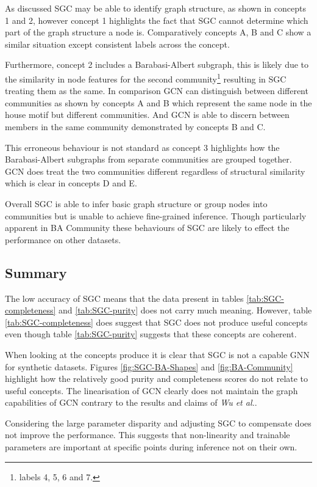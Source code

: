 As discussed SGC may be able to identify graph structure, as shown in concepts 1 and 2, however concept 1 highlights the fact that SGC cannot determine which part of the graph structure a node is.
Comparatively concepts A, B and C show a similar situation except consistent labels across the concept.

Furthermore, concept 2 includes a Barabasi-Albert subgraph, this is likely due to the similarity in node features for the second community\footnote{labels 4, 5, 6 and 7.} resulting in SGC treating them as the same.
In comparison GCN can distinguish between different communities as shown by concepts A and B which represent the same node in the house motif but different communities.
And GCN is able to discern between members in the same community demonstrated by concepts B and C.

This erroneous behaviour is not standard as concept 3 highlights how the Barabasi-Albert subgraphs from separate communities are grouped together.
GCN does treat the two communities different regardless of structural similarity which is clear in concepts D and E.

Overall SGC is able to infer basic graph structure or group nodes into communities but is unable to achieve fine-grained inference.
Though particularly apparent in BA Community these behaviours of SGC are likely to effect the performance on other datasets.

\subsection{Summary}
The low accuracy of SGC means that the data present in tables \ref{tab:SGC-completeness} and \ref{tab:SGC-purity} does not carry much meaning.
However, table \ref{tab:SGC-completeness} does suggest that SGC does not produce useful concepts even though table \ref{tab:SGC-purity} suggests that these concepts are coherent.

When looking at the concepts produce it is clear that SGC is not a capable GNN for synthetic datasets.
Figures \ref{fig:SGC-BA-Shapes} and \ref{fig:BA-Community} highlight how the relatively good purity and completeness scores do not relate to useful concepts.
The linearisation of GCN clearly does not maintain the graph capabilities of GCN contrary to the results and claims of \textit{Wu et al.}.

Considering the large parameter disparity and adjusting SGC to compensate does not improve the performance.
This suggests that non-linearity and trainable parameters are important at specific points during inference not on their own.

